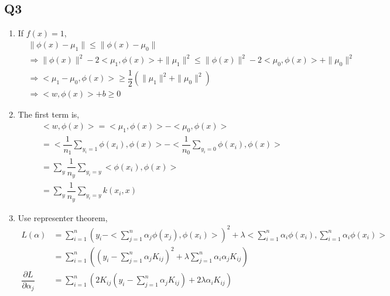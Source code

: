 \documentclass{article}
\begin{document}
\subsection{Q3}
\begin{enumerate}
\item If $f\left(x\right)  = 1$,
\begin{align*}
&  \| \phi\left(x\right) - \mu_{1} \| \leq  \| \phi\left(x\right) - \mu_{0} \|
\\ &\Rightarrow  \| \phi\left(x\right) \|^{2} - 2 <\mu_{1}, \phi\left(x\right)>  + \| \mu_{1} \|^{2} \leq  \| \phi\left(x\right) \|^{2} - 2 <\mu_{0}, \phi\left(x\right)>  + \| \mu_{0} \|^{2}
\\ &\Rightarrow  <\mu_{1} - \mu_{0}, \phi\left(x\right)> \geq  \dfrac{1}{2} \left(\| \mu_{1} \|^{2} + \| \mu_{0} \|^{2}\right)
\\ &\Rightarrow  <w, \phi\left(x\right)> + b \geq  0
\end{align*}
\item The first term is,
\begin{align*}
&<w, \phi\left(x\right)> = <\mu_{1}, \phi\left(x\right)> - <\mu_{0}, \phi\left(x\right)>
\\ &= < \dfrac{1}{n_{1}} \displaystyle\sum_{y_{i} = 1} \phi\left(x_{i}\right), \phi\left(x\right) > - < \dfrac{1}{n_{0}} \displaystyle\sum_{y_{i} = 0} \phi\left(x_{i}\right), \phi\left(x\right) >
\\ &= \displaystyle\sum_{y} \dfrac{1}{n_{y}} \displaystyle\sum_{y_{i} = y} <\phi\left(x_{i}\right), \phi\left(x\right)>
\\ &= \displaystyle\sum_{y} \dfrac{1}{n_{y}} \displaystyle\sum_{y_{i} = y} k\left(x_{i}, x\right)
\end{align*}
\item Use representer theorem,
\begin{align*}
L\left(\alpha\right)  &= \displaystyle\sum_{i=1}^{n} \left(y_{i} - <\displaystyle\sum_{j=1}^{n} \alpha_{j} \phi\left(x_{j}\right), \phi\left(x_{i}\right)>\right)^{2} + \lambda <\displaystyle\sum_{i=1}^{n} \alpha_{i} \phi\left(x_{i}\right), \displaystyle\sum_{i=1}^{n} \alpha_{i} \phi\left(x_{i}\right)>
\\ &= \displaystyle\sum_{i=1}^{n} \left(\left(y_{i} - \displaystyle\sum_{j=1}^{n} \alpha_{j} K_{ij}\right)^{2} + \lambda \displaystyle\sum_{j=1}^{n} \alpha_{i} \alpha_{j} K_{ij}\right)
\\ \dfrac{\partial L}{\partial \alpha_{j}} &= \displaystyle\sum_{i=1}^{n} \left(2 K_{ij} \left(y_{i} - \displaystyle\sum_{j=1}^{n} \alpha_{j} K_{ij}\right) + 2 \lambda \alpha_{i} K_{ij}\right)

\end{align*}
\end{enumerate}
\end{document}
